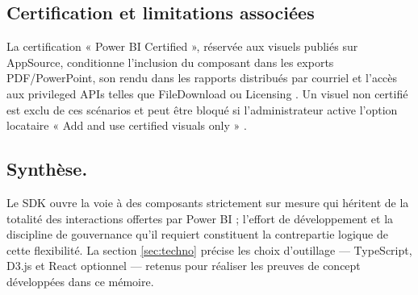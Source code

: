 \subsection{Certification et limitations associées}\label{sec:certification}

La certification « Power BI Certified », réservée aux visuels publiés sur AppSource, conditionne l’inclusion du composant dans les exports PDF/PowerPoint, son rendu dans les rapports distribués par courriel et l’accès aux privileged APIs telles que FileDownload ou Licensing \parencite{MicrosoftCustomVisualsCertified2025, MicrosoftFileDownloadAPI2024}. Un visuel non certifié est exclu de ces scénarios et peut être bloqué si l’administrateur active l’option locataire « Add and use certified visuals only » \parencite{MicrosoftTenantSettings2024}.

\subsection{Synthèse.} Le SDK ouvre la voie à des composants strictement sur mesure qui héritent de la totalité des interactions offertes par Power BI ; l’effort de développement et la discipline de gouvernance qu’il requiert constituent la contrepartie logique de cette flexibilité. La section \ref{sec:techno} précise les choix d’outillage — TypeScript, D3.js et React optionnel — retenus pour réaliser les preuves de concept développées dans ce mémoire.
